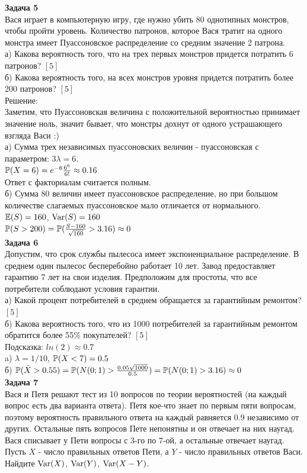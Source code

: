 \documentclass[12pt, a4paper]{article}\usepackage[]{graphicx}\usepackage[]{color}
\begin{document}
\textbf{Задача 5} \\
Вася играет в компьютерную игру, где нужно убить 80 однотипных монстров, чтобы пройти уровень. Количество патронов, которое Вася тратит на одного монстра имеет Пуассоновское распределение со средним значение 2 патрона. \\
а) Какова вероятность того, что на трех первых монстров придется потратить 6 патронов? $[5]$ \\
б) Какова вероятность того, на всех монстров уровня придется потратить более 200 патронов? $[5]$ \\
Решение: \\
Заметим, что Пуассоновская величина с положительной вероятностью принимает значение ноль, значит бывает, что монстры дохнут от одного устрашающего взгляда Васи :) \\
а) Сумма трех независимых пуассоновских величин - пуассоновская с параметром: $3\lambda=6$. \\
$\P(X=6)=e^{-6}\frac{6^6}{6!}\approx 0.16$ \\
Ответ с факториалам считается полным. \\
б) Сумма 80 величин имеет пуассоновское распределение, но при большом количестве слагаемых пуассоновское мало отличается от нормального. \\
$\E(S)=160$, $\Var(S)=160$ \\
$\P(S>200)=\P(\frac{S-160}{\sqrt{160}}>3.16)\approx 0$ \\



\textbf{Задача 6} \\
Допустим, что срок службы пылесоса имеет экспоненциальное распределение. В среднем один пылесос бесперебойно работает 10 лет. Завод предоставляет гарантию 7 лет на свои изделия. Предположим для простоты, что все потребители соблюдают условия гарантии. \\
а) Какой процент потребителей в среднем обращается за гарантийным ремонтом? $[5]$ \\
б) Какова вероятность того, что из 1000 потребителей за гарантийным ремонтом обратится более 55\% покупателей? $[5]$ \\
Подсказка: $ln(2)\approx 0.7$ \\
a) $\lambda=1/10$, $\P(X<7)=0.5$ \\
б) $\P(\bar{X}>0.55)=\P(N(0;1)>\frac{0.05\sqrt{1000}}{0.5})=\P(N(0;1)>3.16)\approx 0$ \\


\textbf{Задача 7} \\ %
Вася и Петя решают тест из 10 вопросов по теории вероятностей (на каждый вопрос есть два варианта ответа). Петя кое-что знает по первым пяти вопросам, поэтому вероятность правильного ответа на каждый равняется 0.9 независимо от других. Остальные пять вопросов Пете непонятны и он отвечает на них наугад. Вася списывает у Пети вопросы с 3-го по 7-ой, а остальные отвечает наугад. \\
Пусть $X$ - число правильных ответов Пети, а $Y$ - число правильных ответов Васи. \\
Найдите $\Var(X)$, $\Var(Y)$, $\Var(X-Y)$. \\
\end{document}
